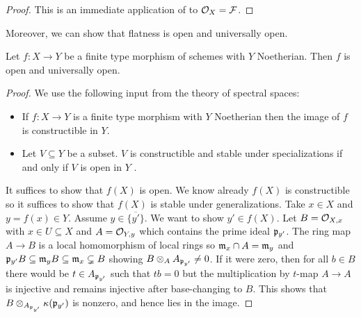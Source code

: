 \begin{proof}
    This is an immediate application of  to $\mathcal{O}_{X}=\mathcal{F}$. 
\end{proof}
Moreover, we can show that flatness is open and universally open. 
\begin{proposition}\label{prop: flatness is universally open}
    Let $f:X\to Y$ be a finite type morphism of schemes with $Y$ Noetherian. Then $f$ is open and universally open.
\end{proposition}
\begin{proof}
    We use the following input from the theory of spectral spaces: 
    \begin{itemize}
        \item If $f:X\to Y$ is a finite type morphism with $Y$ Noetherian then the image of $f$ is constructible in $Y$\cite[\href{https://stacks.math.columbia.edu/tag/054K}{Tag 054K}]{stacks-project}.
        \item Let $V\subseteq Y$ be a subset. $V$ is constructible and stable under specializations if and only if $V$ is open in $Y$ \cite[\href{https://stacks.math.columbia.edu/tag/0542}{Tag 0542}]{stacks-project}. 
    \end{itemize}
    It suffices to show that $f(X)$ is open. We know already $f(X)$ is constructible so it suffices to show that $f(X)$ is stable under generalizations. Take $x\in X$ and $y=f(x)\in Y$. Assume $y\in\overline{\{y'\}}$. We want to show $y'\in f(X)$. Let $B=\mathcal{O}_{X,x}$ with $x\in U\subseteq X$ and $A=\mathcal{O}_{Y,y}$ which contains the prime ideal $\mathfrak{p}_{y'}$. The ring map $A\to B$ is a local homomorphism of local rings so $\mathfrak{m}_{x}\cap A=\mathfrak{m}_{y}$ and $\mathfrak{p}_{y'}B\subseteq\mathfrak{m}_{y}B\subseteq\mathfrak{m}_{x}\subsetneq B$ showing $B\otimes_{A}A_{\mathfrak{p}_{y'}}\neq0$. If it were zero, then for all $b\in B$ there would be $t\in A_{\mathfrak{p}_{y'}}$ such that $tb=0$ but the multiplication by $t$-map $A\to A$ is injective and remains injective after base-changing to $B$. This shows that $B\otimes_{A_{\mathfrak{p}_{y'}}}\kappa(\mathfrak{p}_{y'})$ is nonzero, and hence lies in the image. 
\end{proof}